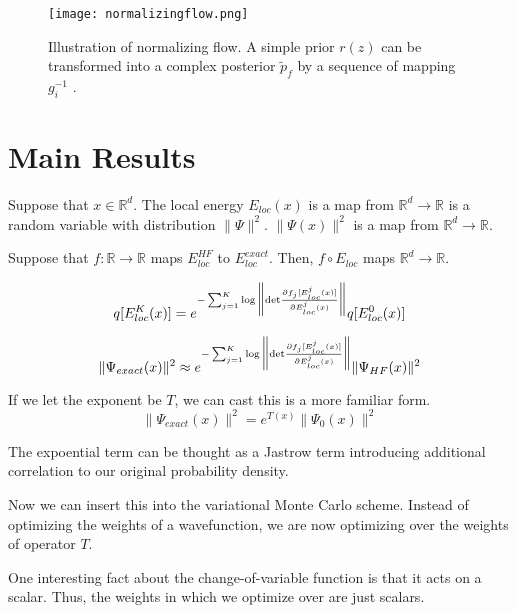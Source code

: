 \documentclass[12pt,a4paper]{article}
\begin{document}
\begin{figure}[t]
  \centering
  \texttt{[image: normalizingflow.png]}
  \caption{Illustration of normalizing flow. A simple prior $r(z)$ can be transformed into a complex posterior $\tilde{p}_f$ by a sequence of mapping $g^{-1}_i$ \cite{Albergo1904.12072}.}
\end{figure}


\section{Main Results}
Suppose that $x \in \mathbb{R}^d$. The local energy $E_{loc}(x)$ is a map from $\mathbb{R}^d\rightarrow\mathbb{R}$ is a random variable with distribution $\|\Psi\|^2$. $\|\Psi(x)\|^2$ is a map from $\mathbb{R}^d\rightarrow\mathbb{R}$.

Suppose that $f:\mathbb{R} \rightarrow\mathbb{R}$ maps $E_{loc}^{HF}$ to $E_{loc}^{exact}$.
Then, $f \circ E_{loc}$ maps $\mathbb{R}^d \rightarrow \mathbb{R}$.

\begin{equation}
q[E_{loc}^K(x)] = e^{ - \sum_{j=1}^K   \log \bigg\| \textnormal{det} \frac{\partial f_j[E_{loc}^j(x)]}{\partial E_{loc}^j(x)} \bigg\|} q[E_{loc}^{0}(x)]
\end{equation}

\begin{equation}
\|\Psi_{exact}(x)\|^2 \approx e^{ - \sum_{j=1}^K   \log \bigg\| \textnormal{det} \frac{\partial f_j[E_{loc}^j(x)]}{\partial E_{loc}^j(x)} \bigg\|} \|\Psi_{HF}(x)\|^2
\end{equation}


If we let the exponent be $T$, we can cast this is a more familiar form.
\begin{equation}
\|\Psi_{exact}(x)\|^2 = e^{T(x)} \|\Psi_0(x)\|^2
\end{equation}

The expoential term can be thought as a Jastrow term introducing additional correlation
to our original probability density.

Now we can insert this into the variational Monte Carlo scheme. Instead of optimizing
the weights of a wavefunction, we are now optimizing over the weights of operator $T$.


One interesting fact about the change-of-variable function is that it acts on a scalar.
Thus, the weights in which we optimize over are just scalars.
\end{document}
